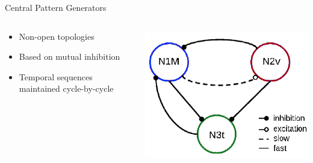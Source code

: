 \documentclass[aspectratio=43]{beamer}
\begin{document}
\begin{frame}{Central Pattern Generators}
		\begin{columns}
			\begin{column}{0.75\textwidth}
				\begin{itemize}
					\item{Non-open topologies}
					\item{Based on mutual inhibition}
					\item{Temporal sequences maintained cycle-by-cycle}
				\end{itemize}
			\end{column}
			\begin{column}{0.3\textwidth}
				\includegraphics[width=\textwidth]{Images/CPG-topology.png} %
			\end{column}
		\end{columns}
		
		\begin{figure}[h!]
			\centering
		\end{figure}	
\end{frame}
\end{document}
